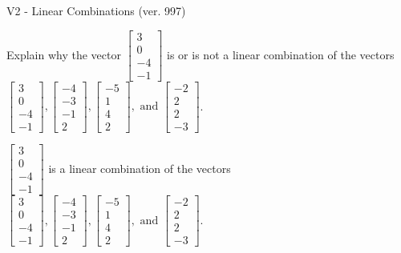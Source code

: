 \begin{exercise}
  \begin{exerciseTitle}V2 - Linear Combinations (ver. 997)\end{exerciseTitle}
  \begin{exerciseStatement}
    Explain why the vector \(\left[\begin{array}{c}
3 \\
0 \\
-4 \\
-1
\end{array}\right]\)  is or is not a linear 
	combination of the vectors \(\left[\begin{array}{c}
3 \\
0 \\
-4 \\
-1
\end{array}\right] , \left[\begin{array}{c}
-4 \\
-3 \\
-1 \\
2
\end{array}\right] , \left[\begin{array}{c}
-5 \\
1 \\
4 \\
2
\end{array}\right] , \text{ and } \left[\begin{array}{c}
-2 \\
2 \\
2 \\
-3
\end{array}\right]\).
	


  \end{exerciseStatement}
  \begin{exerciseAnswer}
   \(\left[\begin{array}{c}
3 \\
0 \\
-4 \\
-1
\end{array}\right]\) 
  	 is  
	a linear combination of the vectors \(\left[\begin{array}{c}
3 \\
0 \\
-4 \\
-1
\end{array}\right] , \left[\begin{array}{c}
-4 \\
-3 \\
-1 \\
2
\end{array}\right] , \left[\begin{array}{c}
-5 \\
1 \\
4 \\
2
\end{array}\right] , \text{ and } \left[\begin{array}{c}
-2 \\
2 \\
2 \\
-3
\end{array}\right]\).


\end{exerciseAnswer}
\end{exercise}
